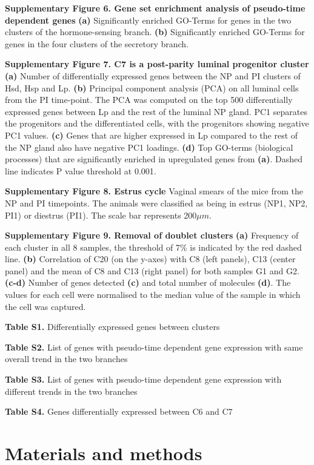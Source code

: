 \documentclass[titlepage, 12pt, oneside]{amsart}
\begin{document}
\textbf{Supplementary Figure 6. Gene set enrichment analysis of pseudo-time dependent genes}
\textbf{(a)} Significantly enriched GO-Terms for genes in the two clusters of the hormone-sensing branch.
\textbf{(b)} Significantly enriched GO-Terms for genes in the four clusters of the secretory branch.

\textbf{Supplementary Figure 7. C7 is a post-parity luminal progenitor cluster}
\textbf{(a)} Number of differentially expressed genes between the NP and PI clusters of Hsd, Hsp and Lp.
\textbf{(b)} Principal component analysis (PCA) on all luminal cells from the PI time-point.
The PCA was computed on the top 500 differentially expressed genes between Lp and the rest of the luminal NP gland.
PC1 separates the progenitors and the differentiated cells, with the progenitors showing negative PC1 values.
\textbf{(c)} Genes that are higher expressed in Lp compared to the rest of the NP gland also have negative PC1 loadings.
\textbf{(d)} Top GO-terms (biological processes) that are significantly enriched in upregulated genes from \textbf{(a)}.
Dashed line indicates P value threshold at 0.001.

\textbf{Supplementary Figure 8. Estrus cycle}
Vaginal smears of the mice from the NP and PI timepoints. The animals were classified as being in estrus (NP1, NP2, PI1) or diestrus (PI1). The scale bar represents 200$\mu m$.

\textbf{Supplementary Figure 9. Removal of doublet clusters}
\textbf{(a)} Frequency of each cluster in all 8 samples, the threshold of 7\% is indicated by the red dashed line.
\textbf{(b)} Correlation of C20 (on the y-axes) with C8 (left panels), C13 (center panel) and the mean of C8 and C13 (right panel) for both samples G1 and G2.
\textbf{(c-d)} Number of genes detected \textbf{(c)} and total number of molecules \textbf{(d)}. The values for each cell were normalised to the median value of the sample in which the cell was captured.

\textbf{Table S1.} Differentially expressed genes between clusters

\textbf{Table S2.} List of genes with pseudo-time dependent gene
expression with same overall trend in the two branches

\textbf{Table S3.} List of genes with pseudo-time dependent gene
expression with different trends in the two branches

\textbf{Table S4.} Genes differentially expressed between C6 and C7 

\section{Materials and methods}
\end{document}
